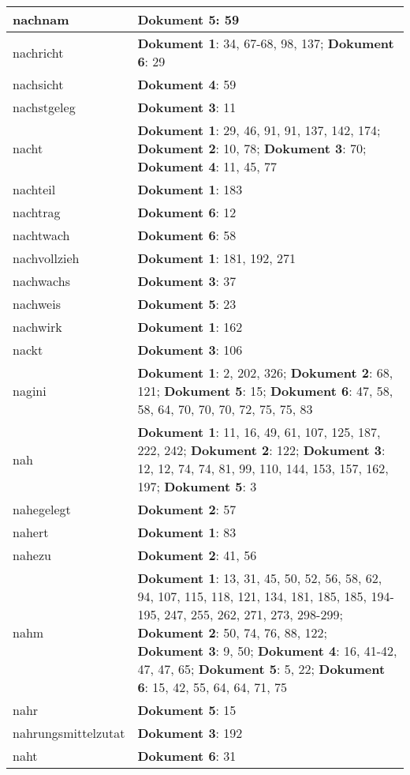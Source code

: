 \documentclass[a5paper]{article}
\begin{document}
\begin{longtable}[l]{|l|p{3in}|}
\hline
nachnam & \textbf{Dokument 5}: 59 \\
\hline
nachricht & \textbf{Dokument 1}: 34, 67-68, 98, 137; \textbf{Dokument 6}: 29 \\
\hline
nachsicht & \textbf{Dokument 4}: 59 \\
\hline
nachstgeleg & \textbf{Dokument 3}: 11 \\
\hline
nacht & \textbf{Dokument 1}: 29, 46, 91, 91, 137, 142, 174; \textbf{Dokument 2}: 10, 78; \textbf{Dokument 3}: 70; \textbf{Dokument 4}: 11, 45, 77 \\
\hline
nachteil & \textbf{Dokument 1}: 183 \\
\hline
nachtrag & \textbf{Dokument 6}: 12 \\
\hline
nachtwach & \textbf{Dokument 6}: 58 \\
\hline
nachvollzieh & \textbf{Dokument 1}: 181, 192, 271 \\
\hline
nachwachs & \textbf{Dokument 3}: 37 \\
\hline
nachweis & \textbf{Dokument 5}: 23 \\
\hline
nachwirk & \textbf{Dokument 1}: 162 \\
\hline
nackt & \textbf{Dokument 3}: 106 \\
\hline
nagini & \textbf{Dokument 1}: 2, 202, 326; \textbf{Dokument 2}: 68, 121; \textbf{Dokument 5}: 15; \textbf{Dokument 6}: 47, 58, 58, 64, 70, 70, 70, 72, 75, 75, 83 \\
\hline
nah & \textbf{Dokument 1}: 11, 16, 49, 61, 107, 125, 187, 222, 242; \textbf{Dokument 2}: 122; \textbf{Dokument 3}: 12, 12, 74, 74, 81, 99, 110, 144, 153, 157, 162, 197; \textbf{Dokument 5}: 3 \\
\hline
nahegelegt & \textbf{Dokument 2}: 57 \\
\hline
nahert & \textbf{Dokument 1}: 83 \\
\hline
nahezu & \textbf{Dokument 2}: 41, 56 \\
\hline
nahm & \textbf{Dokument 1}: 13, 31, 45, 50, 52, 56, 58, 62, 94, 107, 115, 118, 121, 134, 181, 185, 185, 194-195, 247, 255, 262, 271, 273, 298-299; \textbf{Dokument 2}: 50, 74, 76, 88, 122; \textbf{Dokument 3}: 9, 50; \textbf{Dokument 4}: 16, 41-42, 47, 47, 65; \textbf{Dokument 5}: 5, 22; \textbf{Dokument 6}: 15, 42, 55, 64, 64, 71, 75 \\
\hline
nahr & \textbf{Dokument 5}: 15 \\
\hline
nahrungsmittelzutat & \textbf{Dokument 3}: 192 \\
\hline
naht & \textbf{Dokument 6}: 31 \\

\end{longtable}
\end{document}
